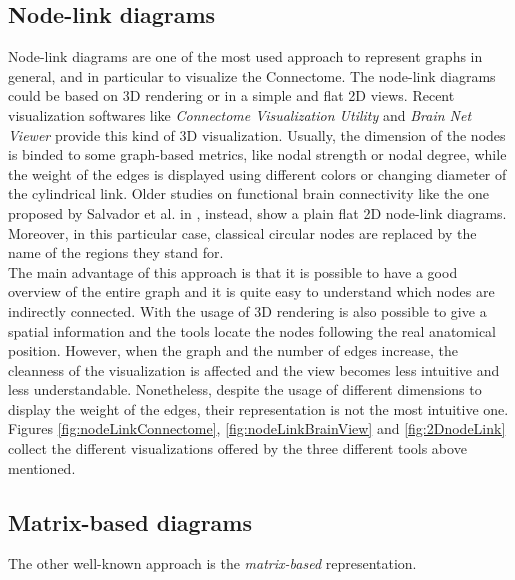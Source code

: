 \documentclass{article}
\begin{document}
\begin{multicols}{2}
\subsection{Node-link diagrams}
Node-link diagrams are one of the most used approach to represent graphs in general, and in particular to visualize the Connectome. The node-link diagrams could be based on 3D rendering or in a simple and flat 2D views. Recent visualization softwares like \textit{Connectome Visualization Utility} \cite{connectomeVisualizationUtility}  and \textit{Brain Net Viewer} \cite{brainNetViewer} provide this kind of 3D visualization. Usually, the dimension of the nodes is binded to some graph-based metrics, like nodal strength or nodal degree, while the weight of the edges is displayed using different colors or changing diameter of the cylindrical link. Older studies on functional brain connectivity like the one proposed by Salvador et al. in \cite{salvador2005undirected}, instead, show a plain flat 2D node-link diagrams. Moreover, in this particular case, classical circular nodes are replaced by the name of the regions they stand for.\\ The main advantage of this approach is that it is possible to have a good overview of the entire graph and it is quite easy to understand which nodes are indirectly connected. With the usage of 3D rendering is also possible to give a spatial information and the tools locate the nodes following the real anatomical position. However, when the graph and the number of edges increase, the cleanness of the visualization is affected and the view becomes less intuitive and less understandable. Nonetheless, despite the usage of different dimensions to display the weight of the edges, their representation is not the most intuitive one. \\
Figures \ref{fig:nodeLinkConnectome}, \ref{fig:nodeLinkBrainView} and \ref{fig:2DnodeLink} collect the different visualizations offered by the three different tools above mentioned.


\subsection{Matrix-based diagrams}
\label{subsec:matrixbased}
The other well-known approach is the \textit{matrix-based} representation. 





\end{multicols}
\end{document}
